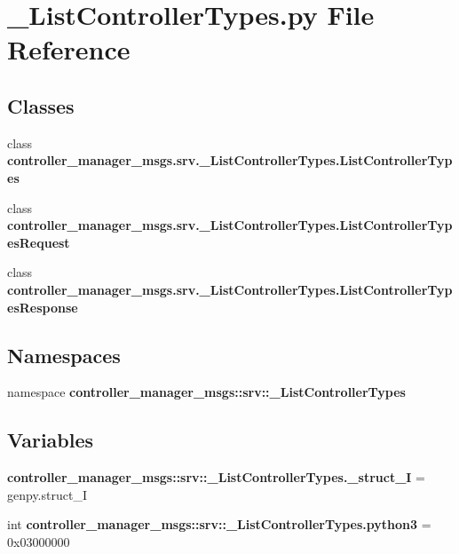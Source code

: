 \section{\-\_\-\-List\-Controller\-Types.\-py \-File \-Reference}
\label{__ListControllerTypes_8py}
\subsection*{\-Classes}
\begin{DoxyCompactItemize}
\item 
class {\bf controller\-\_\-manager\-\_\-msgs.\-srv.\-\_\-\-List\-Controller\-Types.\-List\-Controller\-Types}
\item 
class {\bf controller\-\_\-manager\-\_\-msgs.\-srv.\-\_\-\-List\-Controller\-Types.\-List\-Controller\-Types\-Request}
\item 
class {\bf controller\-\_\-manager\-\_\-msgs.\-srv.\-\_\-\-List\-Controller\-Types.\-List\-Controller\-Types\-Response}
\end{DoxyCompactItemize}
\subsection*{\-Namespaces}
\begin{DoxyCompactItemize}
\item 
namespace {\bf controller\-\_\-manager\-\_\-msgs\-::srv\-::\-\_\-\-List\-Controller\-Types}
\end{DoxyCompactItemize}
\subsection*{\-Variables}
\begin{DoxyCompactItemize}
\item 
{\bf controller\-\_\-manager\-\_\-msgs\-::srv\-::\-\_\-\-List\-Controller\-Types.\-\_\-struct\-\_\-\-I} = genpy.\-struct\-\_\-\-I
\item 
int {\bf controller\-\_\-manager\-\_\-msgs\-::srv\-::\-\_\-\-List\-Controller\-Types.\-python3} = 0x03000000
\end{DoxyCompactItemize}

